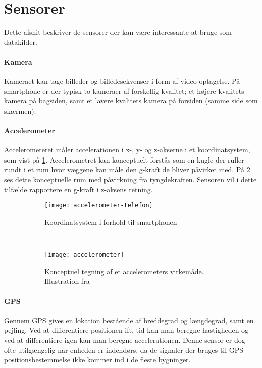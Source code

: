 \section{Sensorer}\label{sensorer}
Dette afsnit beskriver de sensorer der kan være interessante at bruge som datakilder. 

\paragraph{Kamera}
Kameraet kan tage billeder og billedesekvenser i form af video optagelse.
På smartphone er der typisk to kameraer af forskellig kvalitet; et højere kvalitets kamera på bagsiden, samt et lavere kvalitets kamera på forsiden (samme side som skærmen).

\paragraph{Accelerometer}
Accelerometeret måler accelerationen i x-, y- og z-akserne i et koordinatsystem, som vist på \cref{analyse:accelerometer:koo}.
Accelerometret kan konceptuelt forstås som en kugle der ruller rundt i et rum hvor væggene kan måle den g-kraft de bliver påvirket med.
På \cref{analyse:accelerometer:kraft} ses dette konceptuelle rum med påvirkning fra tyngdekraften. 
Sensoren vil i dette tilfælde rapportere en g-kraft i z-aksens retning.

\begin{figure}[h]
	\centering
	\begin{subfigure}[b]{0.47\textwidth}
		\centering
		\texttt{[image: accelerometer-telefon]}
		\caption{Koordinatsystem i forhold til smartphonen}
		\label{analyse:accelerometer:koo}
	\end{subfigure}
	~
	\begin{subfigure}[b]{0.47\textwidth}
		\centering
		\texttt{[image: accelerometer]}
		\caption{Konceptuel tegning af et accelerometers virkemåde. Illustration fra \citep{accelerometer}}
		\label{analyse:accelerometer:kraft}
	\end{subfigure}
	\caption{}
	\label{accelerometer}
\end{figure} 

\paragraph{GPS}
Gennem GPS gives en lokation bestående af breddegrad og længdegrad, samt en pejling.
Ved at differentiere positionen ift. tid kan man beregne hastigheden og ved at differentiere igen kan man beregne accelerationen.
Denne sensor er dog ofte utilgængelig når enheden er indendørs, da de signaler der bruges til GPS positionsbestemmelse ikke kommer ind i de fleste bygninger.

